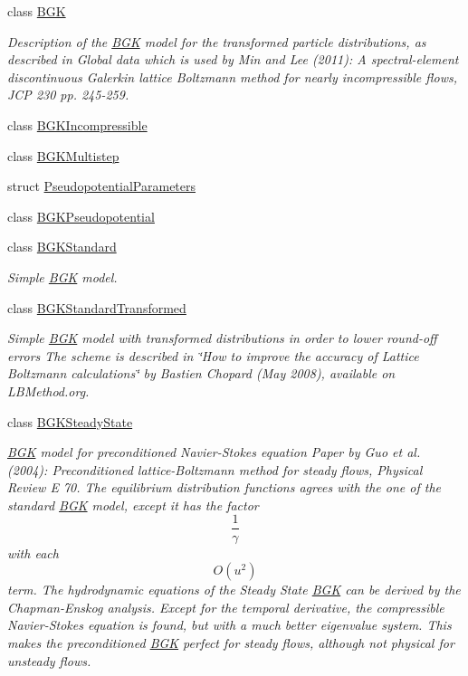 \begin{DoxyCompactItemize}
class \hyperlink{classnatrium_1_1BGK}{BGK}
\begin{DoxyCompactList}\small\item\em Description of the \hyperlink{classnatrium_1_1BGK}{BGK} model for the transformed particle distributions, as described in Global data which is used by Min and Lee (2011): A spectral-\/element discontinuous Galerkin lattice Boltzmann method for nearly incompressible flows, JCP 230 pp. 245-\/259. \item\end{DoxyCompactList}\item 
class \hyperlink{classnatrium_1_1BGKIncompressible}{BGKIncompressible}
\item 
class \hyperlink{classnatrium_1_1BGKMultistep}{BGKMultistep}
\item 
struct \hyperlink{structnatrium_1_1PseudopotentialParameters}{PseudopotentialParameters}
\item 
class \hyperlink{classnatrium_1_1BGKPseudopotential}{BGKPseudopotential}
\item 
class \hyperlink{classnatrium_1_1BGKStandard}{BGKStandard}
\begin{DoxyCompactList}\small\item\em Simple \hyperlink{classnatrium_1_1BGK}{BGK} model. \item\end{DoxyCompactList}\item 
class \hyperlink{classnatrium_1_1BGKStandardTransformed}{BGKStandardTransformed}
\begin{DoxyCompactList}\small\item\em Simple \hyperlink{classnatrium_1_1BGK}{BGK} model with transformed distributions in order to lower round-\/off errors The scheme is described in \char`\"{}How to improve the accuracy of Lattice Boltzmann calculations\char`\"{} by Bastien Chopard (May 2008), available on LBMethod.org. \item\end{DoxyCompactList}\item 
class \hyperlink{classnatrium_1_1BGKSteadyState}{BGKSteadyState}
\begin{DoxyCompactList}\small\item\em \hyperlink{classnatrium_1_1BGK}{BGK} model for preconditioned Navier-\/Stokes equation Paper by Guo et al. (2004): Preconditioned lattice-\/Boltzmann method for steady flows, Physical Review E 70. The equilibrium distribution functions agrees with the one of the standard \hyperlink{classnatrium_1_1BGK}{BGK} model, except it has the factor \[\frac{1}{\gamma}\] with each \[ O(u^2) \] term. The hydrodynamic equations of the Steady State \hyperlink{classnatrium_1_1BGK}{BGK} can be derived by the Chapman-\/Enskog analysis. Except for the temporal derivative, the compressible Navier-\/Stokes equation is found, but with a much better eigenvalue system. This makes the preconditioned \hyperlink{classnatrium_1_1BGK}{BGK} perfect for steady flows, although not physical for unsteady flows. \item\end{DoxyCompactList}\item 

\end{DoxyCompactItemize}
